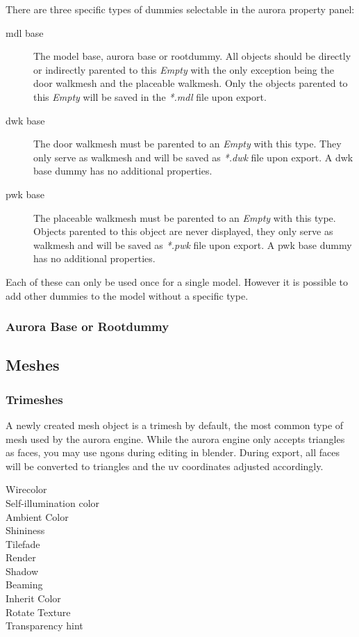 \documentclass[a4paper]{article}
\begin{document}
There are three specific types of dummies selectable in the aurora property panel:
\begin{description}
    \item[mdl base] The model base, aurora base or rootdummy. All objects should be directly or indirectly parented to this {\textit{Empty}} with the only exception being the door walkmesh and the placeable walkmesh. Only the objects parented to this {\textit{Empty}} will be saved in the {\textit{*.mdl}} file upon export.
    \item[dwk base] The door walkmesh must be parented to an {\textit{Empty}} with this type. They only serve as walkmesh  and will be saved as {\textit{*.dwk}} file upon export. A dwk base dummy has no additional properties.
    \item[pwk base] The placeable walkmesh must be parented to an {\textit{Empty}} with this type. Objects parented to this object are never displayed, they only serve as walkmesh and will be saved as {\textit{*.pwk}} file upon export. A pwk base dummy has no additional properties.
\end{description}
Each of these can only be used once for a single model. However it is possible to add other dummies to the model without a specific type.

\subsubsection{Aurora Base or Rootdummy}

\subsection{Meshes}


\subsubsection{Trimeshes}
A newly created mesh object is a trimesh by default, the most common type of mesh used by the aurora engine. While the aurora engine only accepts triangles as faces, you may use ngons during editing in blender. During export, all faces will be converted to triangles and the uv coordinates adjusted accordingly.

\begin{description}
    \item[Wirecolor] 
    \item[Self-illumination color]
    \item[Ambient Color] 
    \item[Shininess]
    \item[Tilefade]
    \item[Render]  
    \item[Shadow]
    \item[Beaming]
    \item[Inherit Color]  
    \item[Rotate Texture]
    \item[Transparency hint]      
\end{description}
\end{document}
